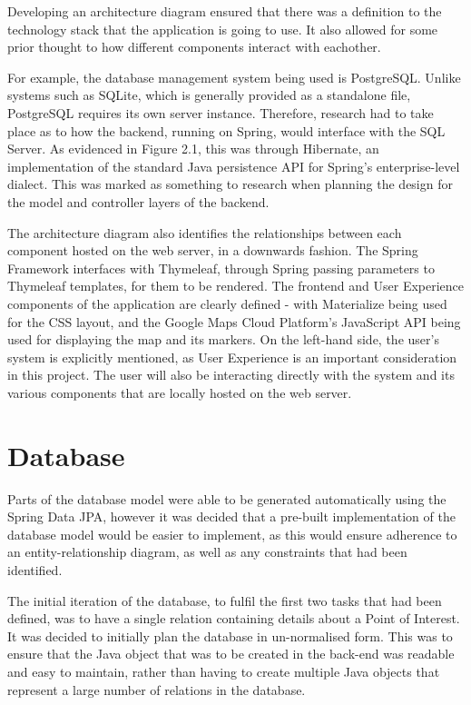 Developing an architecture diagram ensured that there was a definition to the technology stack that the application is going to use. It also allowed for some prior thought to how different components interact with eachother.

For example, the database management system being used is PostgreSQL. Unlike systems such as SQLite, which is generally provided as a standalone file, PostgreSQL requires its own server instance. Therefore, research had to take place as to how the backend, running on Spring, would interface with the SQL Server. As evidenced in Figure 2.1, this was through Hibernate, an implementation of the standard Java persistence API for Spring's enterprise-level dialect. This was marked as something to research when planning the design for the model and controller layers of the backend.

The architecture diagram also identifies the relationships between each component hosted on the web server, in a downwards fashion. The Spring Framework interfaces with Thymeleaf, through Spring passing parameters to Thymeleaf templates, for them to be rendered. The frontend and User Experience components of the application are clearly defined - with Materialize being used for the CSS layout, and the Google Maps Cloud Platform's JavaScript API being used for displaying the map and its markers. On the left-hand side, the user's system is explicitly mentioned, as User Experience is an important consideration in this project. The user will also be interacting directly with the system and its various components that are locally hosted on the web server.

\section{Database}

Parts of the database model were able to be generated automatically using the Spring Data JPA, however it was decided that a pre-built implementation of the database model would be easier to implement, as this would ensure adherence to an entity-relationship diagram, as well as any constraints that had been identified.

The initial iteration of the database, to fulfil the first two tasks that had been defined, was to have a single relation containing details about a Point of Interest. It was decided to initially plan the database in un-normalised form. This was to ensure that the Java object that was to be created in the back-end was readable and easy to maintain, rather than having to create multiple Java objects that represent a large number of relations in the database.

